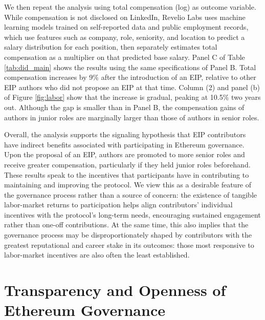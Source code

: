 \documentclass[No]{AEA}
\begin{document}
We then repeat the analysis using total compensation (log) as outcome variable. While compensation is not disclosed on LinkedIn, Revelio Labs uses machine learning models trained on self-reported data and public employment records, which use features such as company, role, seniority, and location to predict a salary distribution for each position, then separately estimates total compensation as a multiplier on that predicted base salary. Panel C of Table \ref{tab:did_main} shows the results using the same specifications of Panel B. Total compensation increases by 9\% after the introduction of an EIP, relative to other EIP authors who did not propose an EIP at that time. Column (2) and panel (b) of Figure \ref{fig:labor} show that the increase is gradual, peaking at 10.5\% two years out. Although the gap is smaller than in Panel B, the compensation gains of authors in junior roles are marginally larger than those of authors in senior roles. 

Overall, the analysis supports the signaling hypothesis that EIP contributors have indirect benefits associated with participating in Ethereum governance. Upon the proposal of an EIP, authors are promoted to more senior roles and receive greater compensation, particularly if they held junior roles beforehand. These results speak to the incentives that participants have in contributing to maintaining and improving the protocol. We view this as a desirable feature of the governance process rather than a source of concern: the existence of tangible labor-market returns to participation helps align contributors' individual incentives with the protocol's long-term needs, encouraging sustained engagement rather than one-off contributions. At the same time, this also implies that the governance process may be disproportionately shaped by contributors with the greatest reputational and career stake in its outcomes: those most responsive to labor-market incentives are also often the least established.



\section{Transparency and Openness of Ethereum Governance} \label{sec:transparency}
\end{document}
